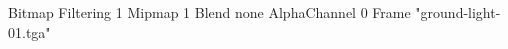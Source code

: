 {Bitmap
	{Filtering 1}
	{Mipmap 1}
	{Blend none}
	{AlphaChannel 0}
	{Frame "ground-light-01.tga"}
}

